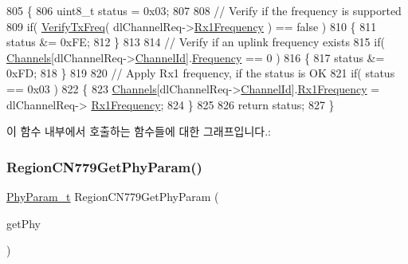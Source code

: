 \begin{DoxyCode}
805 \{
806     uint8\_t status = 0x03;
807 
808     \textcolor{comment}{// Verify if the frequency is supported}
809     \textcolor{keywordflow}{if}( \mbox{\hyperlink{_region_c_n779_8c_af6b3cfa164d4105815aaaa55f02d723e}{VerifyTxFreq}}( dlChannelReq->\mbox{\hyperlink{structs_dl_channel_req_params_a8a564b8635b12d5f0f348ae177dd92e1}{Rx1Frequency}} ) == \textcolor{keyword}{false} )
810     \{
811         status &= 0xFE;
812     \}
813 
814     \textcolor{comment}{// Verify if an uplink frequency exists}
815     \textcolor{keywordflow}{if}( \mbox{\hyperlink{_region_c_n779_8c_ad43b16563c3a87159ec34d1db860a3da}{Channels}}[dlChannelReq->\mbox{\hyperlink{structs_dl_channel_req_params_ae23f953dc29c360e56a3c856404a3276}{ChannelId}}].\mbox{\hyperlink{structs_channel_params_ade3d190636488dad9a89b19446b7acf1}{Frequency}} == 0 )
816     \{
817         status &= 0xFD;
818     \}
819 
820     \textcolor{comment}{// Apply Rx1 frequency, if the status is OK}
821     \textcolor{keywordflow}{if}( status == 0x03 )
822     \{
823         \mbox{\hyperlink{_region_c_n779_8c_ad43b16563c3a87159ec34d1db860a3da}{Channels}}[dlChannelReq->\mbox{\hyperlink{structs_dl_channel_req_params_ae23f953dc29c360e56a3c856404a3276}{ChannelId}}].\mbox{\hyperlink{structs_channel_params_a8a564b8635b12d5f0f348ae177dd92e1}{Rx1Frequency}} = dlChannelReq->
      \mbox{\hyperlink{structs_dl_channel_req_params_a8a564b8635b12d5f0f348ae177dd92e1}{Rx1Frequency}};
824     \}
825 
826     \textcolor{keywordflow}{return} status;
827 \}
\end{DoxyCode}
이 함수 내부에서 호출하는 함수들에 대한 그래프입니다.\+:
\mbox{\label{group___r_e_g_i_o_n_c_n779_gab45c9a48b25622ab197ab8510cc7cbc0}} 
\subsubsection{\texorpdfstring{Region\+C\+N779\+Get\+Phy\+Param()}{RegionCN779GetPhyParam()}}
{\footnotesize\ttfamily \mbox{\hyperlink{group___r_e_g_i_o_n_gaed159b26e5c4677236b6e8677019db30}{Phy\+Param\+\_\+t}} Region\+C\+N779\+Get\+Phy\+Param (\begin{DoxyParamCaption}\item[{\mbox{\hyperlink{group___r_e_g_i_o_n_gab471483fff904f4f89bbc03f7fc380ab}{Get\+Phy\+Params\+\_\+t}} $\ast$}]{get\+Phy }\end{DoxyParamCaption})}



